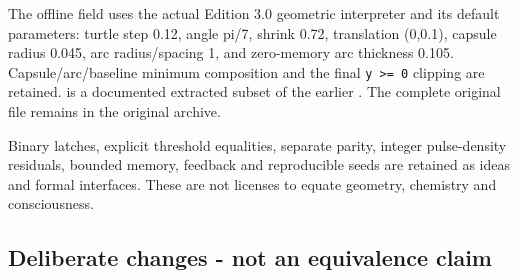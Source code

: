 \documentclass[11pt,a4paper]{article}
\begin{document}
The offline field uses the actual Edition 3.0 geometric interpreter and its default parameters: turtle step 0.12, angle pi/7, shrink 0.72, translation (0,0.1), capsule radius 0.045, arc radius/spacing 1, and zero-memory arc thickness 0.105. Capsule/arc/baseline minimum composition and the final \texttt{y\ \textgreater{}=\ 0} clipping are retained.  is a documented extracted subset of the earlier . The complete original file remains in the original archive.

Binary latches, explicit threshold equalities, separate parity, integer pulse-density residuals, bounded memory, feedback and reproducible seeds are retained as ideas and formal interfaces. These are not licenses to equate geometry, chemistry and consciousness.

\subsection{Deliberate changes - not an equivalence claim}\label{deliberate-changes---not-an-equivalence-claim}
\end{document}
